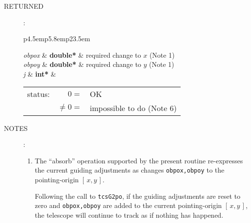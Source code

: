 \documentclass[12pt,fleqn,twoside]{article}
\renewcommand{\_}{{\tt\char'137}}     %
\newcommand{\xy}        {$[\,x,y\,]$}
\newcommand{\args}[2]
{
  \goodbreak
  \begin{description}
  \item[#1]: \\[1.5ex] \nopagebreak
    \hspace*{-0.9em}
    \begin{tabular}{p{4.5em}p{5.8em}p{23.5em}}
      #2
    \end{tabular}
  \end{description}
  \vspace{-3ex}
}
\newcommand{\spec}[3]
{
  {\em {#1}} & {\bf \mbox{#2}} & {#3}
}
\newcommand{\notes}[1]
{
  \goodbreak
  \begin{description}
    \item[NOTES]: \nopagebreak
        #1
  \end{description}
  \vspace{-3ex}
}
\begin{document}
\args{RETURNED}
{
\spec{obpox}{double*}{required change to $x$ (Note 1)} \\
\spec{obpoy}{double*}{required change to $y$ (Note 1)} \\
\spec{j}{int*}{\hspace{-1.8ex}
               \begin{tabular}[t]{lrl}
                  status: & $  0 = $ & OK \\
                          & $ \neq 0 = $ & impossible to do (Note 6)
               \end{tabular}
              }
}
\notes{
\begin{enumerate}
\setlength{\parskip}{\medskipamount}
\item The ``absorb'' operation supported by the present routine
      re-expresses the current guiding adjustments as changes
      {\tt obpox,obpoy} to the pointing-origin \xy.

      Following the call to {\tt tcsG2po},
      if the guiding adjustments are reset
      to zero and {\tt obpox,obpoy} are added to the current
      pointing-origin \xy, the telescope will continue to track
      as if nothing has happened.


\end{enumerate}}
\end{document}
